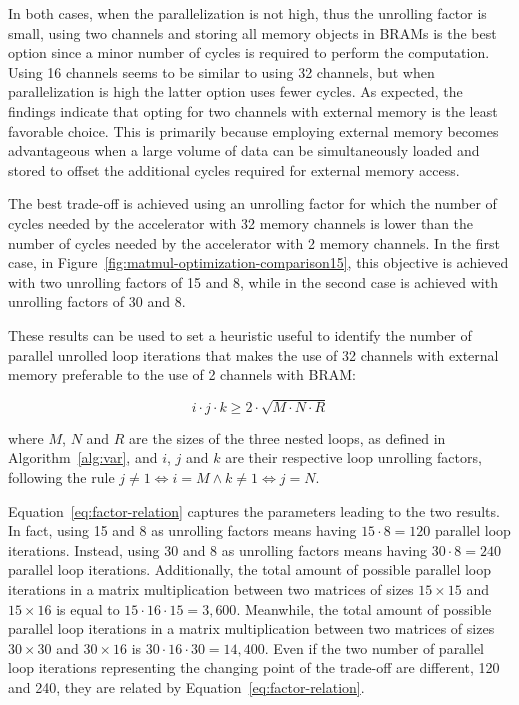 In both cases, when the parallelization is not high, thus the unrolling factor is small, using two channels and storing all memory objects in BRAMs is the best option since a minor number of cycles is required to perform the computation.
Using 16 channels seems to be similar to using 32 channels, but when parallelization is high the latter option uses fewer cycles.
As expected, the findings indicate that opting for two channels with external memory is the least favorable choice.
This is primarily because employing external memory becomes advantageous when a large volume of data can be simultaneously loaded and stored to offset the additional cycles required for external memory access.

The best trade-off is achieved using an unrolling factor for which the number of cycles needed by the accelerator with 32 memory channels is lower than the number of cycles needed by the accelerator with 2 memory channels.
In the first case, in Figure~\ref{fig:matmul-optimization-comparison15}, this objective is achieved with two unrolling factors of 15 and 8, while in the second case is achieved with unrolling factors of 30 and 8.

These results can be used to set a heuristic useful to identify the number of parallel unrolled loop iterations that makes the use of 32 channels with external memory preferable to the use of 2 channels with BRAM:

\begin{equation}
    \label{eq:factor-relation}
        i \cdot j \cdot k \geq 2 \cdot \sqrt {M \cdot N \cdot R}
\end{equation}

where $M$, $N$ and $R$ are the sizes of the three nested loops, as defined in Algorithm~\ref{alg:var}, and $i$, $j$ and $k$ are their respective loop unrolling factors, following the rule $j \neq 1 \iff i=M \land k \neq 1 \iff j=N$.

Equation~\ref{eq:factor-relation} captures the parameters leading to the two results.
In fact, using 15 and 8 as unrolling factors means having $15 \cdot 8 = 120$ parallel loop iterations.
Instead, using 30 and 8 as unrolling factors means having $30 \cdot 8 = 240$ parallel loop iterations.
Additionally, the total amount of possible parallel loop iterations in a matrix multiplication between two matrices of sizes $15\times15$ and $15\times16$ is equal to $15 \cdot 16 \cdot 15 = 3,600$.
Meanwhile, the total amount of possible parallel loop iterations in a matrix multiplication between two matrices of sizes $30\times30$ and $30\times16$ is $30 \cdot 16 \cdot 30 = 14,400$.
Even if the two number of parallel loop iterations representing the changing point of the trade-off are different, 120 and 240, they are related by Equation~\ref{eq:factor-relation}.

